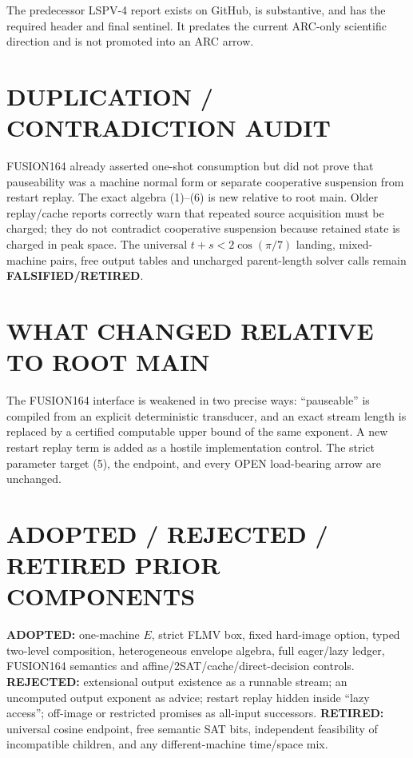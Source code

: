 \documentclass[11pt]{article}
\begin{document}
The predecessor LSPV-4 report
exists on GitHub, is substantive, and has the required header and final
sentinel.  It predates the current ARC-only scientific direction and is not
promoted into an ARC arrow.

\section{DUPLICATION / CONTRADICTION AUDIT}
FUSION164 already asserted one-shot consumption but did not prove that
pauseability was a machine normal form or separate cooperative suspension from
restart replay.  The exact algebra (1)--(6) is new relative to root main.
Older replay/cache reports correctly warn that repeated source acquisition must
be charged; they do not contradict cooperative suspension because retained
state is charged in peak space.  The universal $t+s<2\cos(\pi/7)$ landing,
mixed-machine pairs, free output tables and uncharged parent-length solver calls
remain \textbf{FALSIFIED/RETIRED}.

\section{WHAT CHANGED RELATIVE TO ROOT MAIN}
The FUSION164 interface is weakened in two precise ways: ``pauseable'' is
compiled from an explicit deterministic transducer, and an exact stream length
is replaced by a certified computable upper bound of the same exponent.  A new
restart replay term is added as a hostile implementation control.  The strict
parameter target (5), the endpoint, and every OPEN load-bearing arrow are
unchanged.

\section{ADOPTED / REJECTED / RETIRED PRIOR COMPONENTS}
\textbf{ADOPTED:} one-machine $E$, strict FLMV box, fixed hard-image option,
typed two-level composition, heterogeneous envelope algebra, full eager/lazy
ledger, FUSION164 semantics and affine/2SAT/cache/direct-decision controls.
\textbf{REJECTED:} extensional output existence as a runnable stream; an
uncomputed output exponent as advice; restart replay hidden inside ``lazy
access''; off-image or restricted promises as all-input successors.
\textbf{RETIRED:} universal cosine endpoint, free semantic SAT bits, independent
feasibility of incompatible children, and any different-machine time/space mix.
\end{document}
